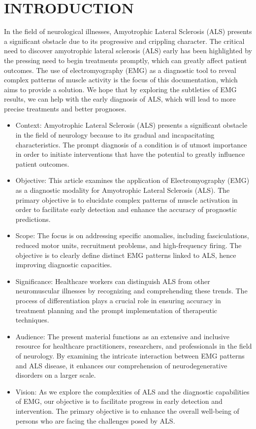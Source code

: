 \documentclass[ 12pt,a4paper,twocolumn,fleqn]{report}
\begin{document}
\chapter{INTRODUCTION}
In the field of neurological illnesses, Amyotrophic Lateral Sclerosis (ALS) presents a significant obstacle due to its progressive and crippling character. The critical need to discover amyotrophic lateral sclerosis (ALS) early has been highlighted by the pressing need to begin treatments promptly, which can greatly affect patient outcomes. The use of electromyography (EMG) as a diagnostic tool to reveal complex patterns of muscle activity is the focus of this documentation, which aims to provide a solution. We hope that by exploring the subtleties of EMG results, we can help with the early diagnosis of ALS, which will lead to more precise treatments and better prognoses.
\begin{itemize}
    \item Context:
Amyotrophic Lateral Sclerosis (ALS) presents a significant obstacle in the field of neurology because to its gradual and incapacitating characteristics. The prompt diagnosis of a condition is of utmost importance in order to initiate interventions that have the potential to greatly influence patient outcomes.
\item Objective:
This article examines the application of Electromyography (EMG) as a diagnostic modality for Amyotrophic Lateral Sclerosis (ALS). The primary objective is to elucidate complex patterns of muscle activation in order to facilitate early detection and enhance the accuracy of prognostic predictions.
\item Scope:
The focus is on addressing specific anomalies, including fasciculations, reduced motor units, recruitment problems, and high-frequency firing. The objective is to clearly define distinct EMG patterns linked to ALS, hence improving diagnostic capacities.
\item Significance:
Healthcare workers can distinguish ALS from other neuromuscular illnesses by recognizing and comprehending these trends. The process of differentiation plays a crucial role in ensuring accuracy in treatment planning and the prompt implementation of therapeutic techniques.
\end{itemize}

\newpage
  \pagestyle{fancy}
\thisfancypage{%
  \setlength{\fboxsep}{20pt}\doublebox}{}
\normalsize
\begin{itemize}
    \item Audience:
The present material functions as an extensive and inclusive resource for healthcare practitioners, researchers, and professionals in the field of neurology. By examining the intricate interaction between EMG patterns and ALS disease, it enhances our comprehension of neurodegenerative disorders on a larger scale.

    \item Vision:
As we explore the complexities of ALS and the diagnostic capabilities of EMG, our objective is to facilitate progress in early detection and intervention. The primary objective is to enhance the overall well-being of persons who are facing the challenges posed by ALS.

\end{itemize}
\end{document}
